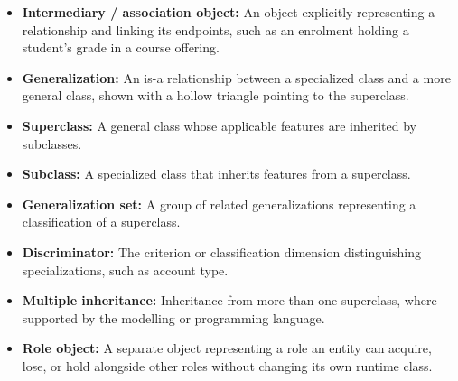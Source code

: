 \documentclass[11pt]{article}
\newenvironment{DottedList}{%
  \begin{itemize}[leftmargin=2em, itemsep=0.35em, topsep=0.35em, label=\textbullet]
}{%
  \end{itemize}
}
\begin{document}
\begin{DottedList}
  \item \textbf{Intermediary / association object:} An object explicitly representing a relationship and linking its endpoints, such as an enrolment holding a student's grade in a course offering.
  \item \textbf{Generalization:} An is-a relationship between a specialized class and a more general class, shown with a hollow triangle pointing to the superclass.
  \item \textbf{Superclass:} A general class whose applicable features are inherited by subclasses.
  \item \textbf{Subclass:} A specialized class that inherits features from a superclass.
  \item \textbf{Generalization set:} A group of related generalizations representing a classification of a superclass.
  \item \textbf{Discriminator:} The criterion or classification dimension distinguishing specializations, such as account type.
  \item \textbf{Multiple inheritance:} Inheritance from more than one superclass, where supported by the modelling or programming language.
  \item \textbf{Role object:} A separate object representing a role an entity can acquire, lose, or hold alongside other roles without changing its own runtime class.
\end{DottedList}
\end{document}
